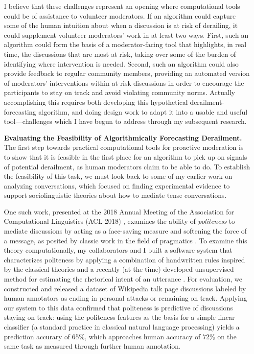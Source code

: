 \documentclass[11pt,letterpaper]{article}
\renewcommand{\section}[1]{\vspace{0.25\baselineskip}\noindent\textbf{#1.}}
\begin{document}
I believe that these challenges represent an opening where computational tools could be of assistance to volunteer moderators.
If an algorithm could capture some of the human intuition about when a discussion is at risk of derailing, it could supplement volunteer moderators' work in at least two ways.
First, such an algorithm could form the basis of a moderator-facing tool that highlights, in real time, the discussions that are most at risk, taking over some of the burden of identifying where intervention is needed.
Second, such an algorithm could also provide feedback to regular community members, providing an automated version of moderators' interventions within at-risk discussions in order to encourage the participants to stay on track and avoid violating community norms.
Actually accomplishing this requires both developing this hypothetical derailment-forecasting algorithm, and doing design work to adapt it into a usable and useful tool---challenges which I have begun to address through my subsequent research.

\section{Evaluating the Feasibility of Algorithmically Forecasting Derailment}
The first step towards practical computational tools for proactive moderation is to show that it is feasible in the first place for an algorithm to pick up on signals of potential derailment, as human moderators claim to be able to do.
To establish the feasibility of this task, we must look back to some of my earlier work on analyzing conversations, which focused on finding experimental evidence to support sociolinguistic theories about how to mediate tense conversations.

One such work, presented at the 2018 Annual Meeting of the Association for Computational Linguistics (ACL 2018) \cite{zhang_conversations_2018}, examines the ability of \emph{politeness} to mediate discussions by acting as a face-saving measure and softening the force of a message, as posited by classic work in the field of pragmatics \cite{clark_polite_1980-1,brown_politeness:_1987}.
To examine this theory computationally, my collaborators and I built a software system that characterizes politeness by applying a combination of handwritten rules inspired by the classical theories \cite{danescu-niculescu-mizil_computational_2013} and a recently (at the time) developed unsupervised method for estimating the rhetorical intent of an utterance \cite{zhang_asking_2017}.
For evaluation, we constructed and released a dataset of Wikipedia talk page discussions labeled by human annotators as ending in personal attacks or remaining on track.
Applying our system to this data confirmed that politeness is predictive of discussions staying on track: using the politeness features as the basis for a simple linear classifier (a standard practice in classical natural language processing) yields a prediction accurary of 65\%, which approaches human accuracy of 72\% on the same task as measured through further human annotation.
\end{document}
